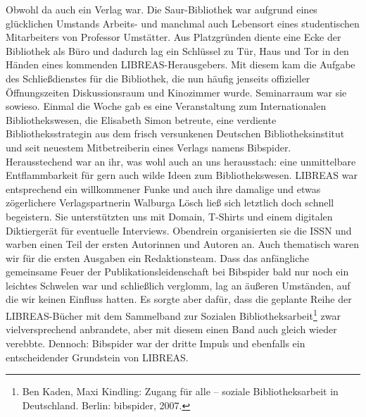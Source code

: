 Obwohl da auch ein Verlag war. Die Saur-Bibliothek war aufgrund eines
glücklichen Umstands Arbeits- und manchmal auch Lebensort eines
studentischen Mitarbeiters von Professor Umstätter. Aus Platzgründen
diente eine Ecke der Bibliothek als Büro und dadurch lag ein Schlüssel
zu Tür, Haus und Tor in den Händen eines kommenden LIBREAS-Herausgebers.
Mit diesem kam die Aufgabe des Schließdienstes für die Bibliothek, die
nun häufig jenseits offizieller Öffnungszeiten Diskussionsraum und
Kinozimmer wurde. Seminarraum war sie sowieso. Einmal die Woche gab es
eine Veranstaltung zum Internationalen Bibliothekswesen, die Elisabeth
Simon betreute, eine verdiente Bibliotheksstrategin aus dem frisch
versunkenen Deutschen Bibliotheksinstitut und seit neuestem
Mitbetreiberin eines Verlags namens Bibspider. Herausstechend war an
ihr, was wohl auch an uns herausstach: eine unmittelbare Entflammbarkeit
für gern auch wilde Ideen zum Bibliothekswesen. LIBREAS war entsprechend
ein willkommener Funke und auch ihre damalige und etwas zögerlichere
Verlagspartnerin Walburga Lösch ließ sich letztlich doch schnell
begeistern. Sie unterstützten uns mit Domain, T-Shirts und einem
digitalen Diktiergerät für eventuelle Interviews. Obendrein
organisierten sie die ISSN und warben einen Teil der ersten Autorinnen
und Autoren an. Auch thematisch waren wir für die ersten Ausgaben ein
Redaktionsteam. Dass das anfängliche gemeinsame Feuer der
Publikationsleidenschaft bei Bibspider bald nur noch ein leichtes
Schwelen war und schließlich verglomm, lag an äußeren Umständen, auf die
wir keinen Einfluss hatten. Es sorgte aber dafür, dass die geplante
Reihe der LIBREAS-Bücher mit dem Sammelband zur Sozialen
Bibliotheksarbeit\footnote{Ben Kaden, Maxi Kindling: Zugang für alle --
  soziale Bibliotheksarbeit in Deutschland. Berlin: bibspider, 2007.}
zwar vielversprechend anbrandete, aber mit diesem einen Band auch gleich
wieder verebbte. Dennoch: Bibspider war der dritte Impuls und ebenfalls
ein entscheidender Grundstein von LIBREAS.

